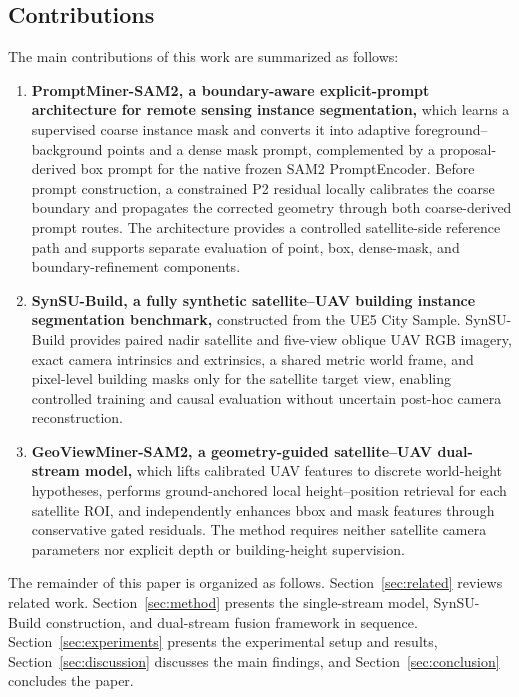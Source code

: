 \documentclass[letterpaper,journal]{IEEEtran}
\begin{document}
\subsection{Contributions}

The main contributions of this work are summarized as follows:
\begin{enumerate}
\item \textbf{PromptMiner-SAM2, a boundary-aware explicit-prompt architecture for remote sensing instance segmentation,} which learns a supervised coarse instance mask and converts it into adaptive foreground--background points and a dense mask prompt, complemented by a proposal-derived box prompt for the native frozen SAM2 PromptEncoder. Before prompt construction, a constrained P2 residual locally calibrates the coarse boundary and propagates the corrected geometry through both coarse-derived prompt routes. The architecture provides a controlled satellite-side reference path and supports separate evaluation of point, box, dense-mask, and boundary-refinement components.

\item \textbf{SynSU-Build, a fully synthetic satellite--UAV building instance segmentation benchmark,} constructed from the UE5 City Sample. SynSU-Build provides paired nadir satellite and five-view oblique UAV RGB imagery, exact camera intrinsics and extrinsics, a shared metric world frame, and pixel-level building masks only for the satellite target view, enabling controlled training and causal evaluation without uncertain post-hoc camera reconstruction.

\item \textbf{GeoViewMiner-SAM2, a geometry-guided satellite--UAV dual-stream model,} which lifts calibrated UAV features to discrete world-height hypotheses, performs ground-anchored local height--position retrieval for each satellite ROI, and independently enhances bbox and mask features through conservative gated residuals. The method requires neither satellite camera parameters nor explicit depth or building-height supervision.
\end{enumerate}

The remainder of this paper is organized as follows. Section~\ref{sec:related} reviews related work. Section~\ref{sec:method} presents the single-stream model, SynSU-Build construction, and dual-stream fusion framework in sequence. Section~\ref{sec:experiments} presents the experimental setup and results, Section~\ref{sec:discussion} discusses the main findings, and Section~\ref{sec:conclusion} concludes the paper.
\end{document}

